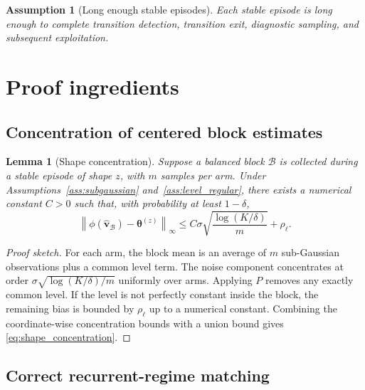 \documentclass[11pt]{article}
\newtheorem{assumption}{Assumption}
\newtheorem{lemma}{Lemma}
\newcommand{\norm}[1]{\left\lVert #1 \right\rVert}
\begin{document}
\begin{assumption}[Long enough stable episodes]
\label{ass:long_episodes}
Each stable episode is long enough to complete transition detection, transition exit, diagnostic sampling, and subsequent exploitation.
\end{assumption}

\section{Proof ingredients}
\label{sec:proof_ingredients}

\subsection{Concentration of centered block estimates}
\label{subsec:block_concentration}

\begin{lemma}[Shape concentration]
\label{lem:shape_concentration}
Suppose a balanced block $\mathcal B$ is collected during a stable episode of shape $z$, with $m$ samples per arm. Under Assumptions~\ref{ass:subgaussian} and~\ref{ass:level_regular}, there exists a numerical constant $C>0$ such that, with probability at least $1-\delta$,
\begin{equation}
\label{eq:shape_concentration}
\norm{\phi(\widehat{\bm v}_{\mathcal B})-\bm\theta^{(z)}}_{\infty}
\leq
C\sigma\sqrt{\frac{\log(K/\delta)}{m}}
+
\rho_{\ell}.
\end{equation}
\end{lemma}

\begin{proof}[Proof sketch]
For each arm, the block mean is an average of $m$ sub-Gaussian observations plus a common level term. The noise component concentrates at order $\sigma\sqrt{\log(K/\delta)/m}$ uniformly over arms. Applying $P$ removes any exactly common level. If the level is not perfectly constant inside the block, the remaining bias is bounded by $\rho_{\ell}$ up to a numerical constant. Combining the coordinate-wise concentration bounds with a union bound gives \eqref{eq:shape_concentration}.
\end{proof}

\subsection{Correct recurrent-regime matching}
\label{subsec:matching_proof}
\end{document}
